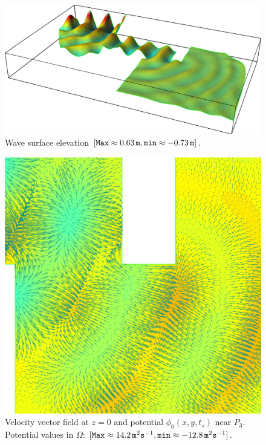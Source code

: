 \begin{figure}
  \begin{center}
    \includegraphics[width=\largefig]{chapters/lopes/pdf/eta.pdf}
  \end{center}
  \caption{Wave surface elevation $[{\tt Max}\approx 0.63\,{\tt m},
    {\tt min}\approx-0.73\,{\tt m}] $.}
  \label{fig:lopes:elevation}
\end{figure}

\begin{figure}
  \begin{center}
    \includegraphics[width=\largefig]{chapters/lopes/pdf/pvel2.pdf}
  \end{center}
  \caption{Velocity vector field at $z=0$ and potential
    $\phi_0(x,y,t_s)$ near $P_3$. Potential values in $\Omega$: $[{\tt
      Max}\approx 14.2\,{\tt m}^{2}{\tt s}^{-1}, {\tt min}\approx-12.8\,
    {\tt m}^{2}{\tt s}^{-1}]$.}
  \label{fig:lopes:potential1}
\end{figure}

